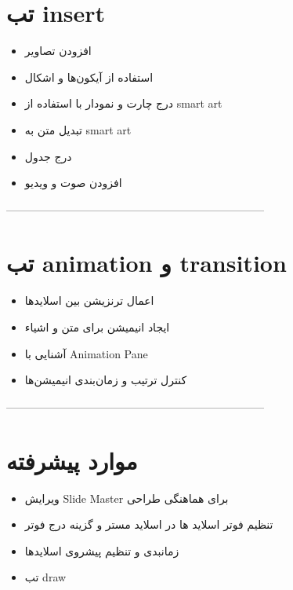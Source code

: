 \section{تب insert}
\begin{itemize}
\item
افزودن تصاویر
\item
استفاده از آیکون‌ها و اشکال
\item
درج چارت و نمودار با استفاده از smart art
\item
تبدیل متن به smart art
\item
درج جدول
\item
افزودن صوت و ویدیو
\end{itemize}

-----------------------------------------------------------------------
\section{تب animation و transition}
\begin{itemize}
\item
اعمال ترنزیشن بین اسلایدها
\item
ایجاد انیمیشن برای متن و اشیاء
\item
آشنایی با Animation Pane
\item
کنترل ترتیب و زمان‌بندی انیمیشن‌ها
\end{itemize}
-----------------------------------------------------------------------
\section{موارد پیشرفته}
\begin{itemize}
\item
ویرایش Slide Master برای هماهنگی طراحی
\item
تنظیم فوتر اسلاید ها در اسلاید مستر و گزینه درج فوتر
\item
زمانبدی و تنظیم پیشروی اسلاید‌ها
\item
تب draw
\end{itemize}